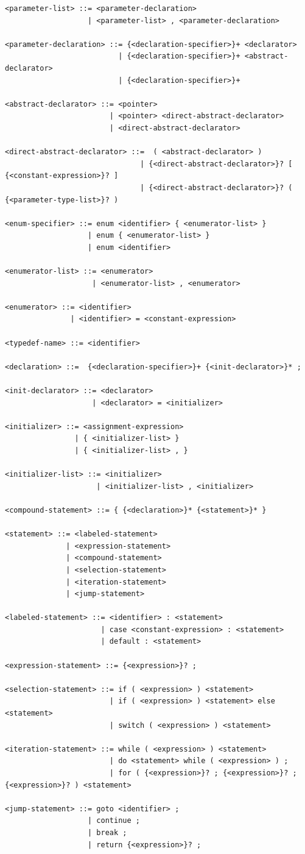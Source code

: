 \documentclass[
	12pt, %
]{fphw}
\begin{document}
\begin{verbatim}
<parameter-list> ::= <parameter-declaration>
                   | <parameter-list> , <parameter-declaration>

<parameter-declaration> ::= {<declaration-specifier>}+ <declarator>
                          | {<declaration-specifier>}+ <abstract-declarator>
                          | {<declaration-specifier>}+

<abstract-declarator> ::= <pointer>
                        | <pointer> <direct-abstract-declarator>
                        | <direct-abstract-declarator>

<direct-abstract-declarator> ::=  ( <abstract-declarator> )
                               | {<direct-abstract-declarator>}? [ {<constant-expression>}? ]
                               | {<direct-abstract-declarator>}? ( {<parameter-type-list>}? )

<enum-specifier> ::= enum <identifier> { <enumerator-list> }
                   | enum { <enumerator-list> }
                   | enum <identifier>

<enumerator-list> ::= <enumerator>
                    | <enumerator-list> , <enumerator>

<enumerator> ::= <identifier>
               | <identifier> = <constant-expression>

<typedef-name> ::= <identifier>

<declaration> ::=  {<declaration-specifier>}+ {<init-declarator>}* ;

<init-declarator> ::= <declarator>
                    | <declarator> = <initializer>

<initializer> ::= <assignment-expression>
                | { <initializer-list> }
                | { <initializer-list> , }

<initializer-list> ::= <initializer>
                     | <initializer-list> , <initializer>

<compound-statement> ::= { {<declaration>}* {<statement>}* }

<statement> ::= <labeled-statement>
              | <expression-statement>
              | <compound-statement>
              | <selection-statement>
              | <iteration-statement>
              | <jump-statement>

<labeled-statement> ::= <identifier> : <statement>
                      | case <constant-expression> : <statement>
                      | default : <statement>

<expression-statement> ::= {<expression>}? ;

<selection-statement> ::= if ( <expression> ) <statement>
                        | if ( <expression> ) <statement> else <statement>
                        | switch ( <expression> ) <statement>

<iteration-statement> ::= while ( <expression> ) <statement>
                        | do <statement> while ( <expression> ) ;
                        | for ( {<expression>}? ; {<expression>}? ; {<expression>}? ) <statement>

<jump-statement> ::= goto <identifier> ;
                   | continue ;
                   | break ;
                   | return {<expression>}? ;
\end{verbatim}
\end{document}
